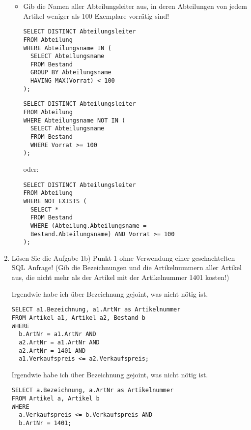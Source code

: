 \documentclass{lehramt-informatik-aufgabe}
\begin{document}
\begin{enumerate}
\begin{itemize}

\item Gib die Namen aller Abteilungsleiter aus, in deren Abteilungen von
jedem Artikel weniger als 100 Exemplare vorrätig sind!

\begin{antwort}[richtig]
\begin{verbatim}
SELECT DISTINCT Abteilungsleiter
FROM Abteilung
WHERE Abteilungsname IN (
  SELECT Abteilungsname
  FROM Bestand
  GROUP BY Abteilungsname
  HAVING MAX(Vorrat) < 100
);
\end{verbatim}
\end{antwort}

\begin{antwort}[richtig]
\begin{verbatim}
SELECT DISTINCT Abteilungsleiter
FROM Abteilung
WHERE Abteilungsname NOT IN (
  SELECT Abteilungsname
  FROM Bestand
  WHERE Vorrat >= 100
);
\end{verbatim}
\end{antwort}

oder:

\begin{antwort}[muster]
\begin{verbatim}
SELECT DISTINCT Abteilungsleiter
FROM Abteilung
WHERE NOT EXISTS (
  SELECT *
  FROM Bestand
  WHERE (Abteilung.Abteilungsname =
  Bestand.Abteilungsname) AND Vorrat >= 100
);
\end{verbatim}
\end{antwort}
\end{itemize}


\item Lösen Sie die Aufgabe 1b) Punkt 1 ohne Verwendung einer
geschachtelten SQL Anfrage! (Gib die Bezeichnungen und die
Artikelnummern aller Artikel aus, die nicht mehr als der Artikel mit der
Artikelnummer 1401 kosten!)
\begin{antwort}[falsch]
Irgendwie habe ich über Bezeichnung gejoint, was nicht nötig ist.
\begin{verbatim}
SELECT a1.Bezeichnung, a1.ArtNr as Artikelnummer
FROM Artikel a1, Artikel a2, Bestand b
WHERE
  b.ArtNr = a1.ArtNr AND
  a2.ArtNr = a1.ArtNr AND
  a2.ArtNr = 1401 AND
  a1.Verkaufspreis <= a2.Verkaufspreis;
\end{verbatim}
\end{antwort}

\begin{antwort}[muster]
Irgendwie habe ich über Bezeichnung gejoint, was nicht nötig ist.
\begin{verbatim}
SELECT a.Bezeichnung, a.ArtNr as Artikelnummer
FROM Artikel a, Artikel b
WHERE
  a.Verkaufspreis <= b.Verkaufspreis AND
  b.ArtNr = 1401;
\end{verbatim}
\end{antwort}


\end{enumerate}
\end{document}
